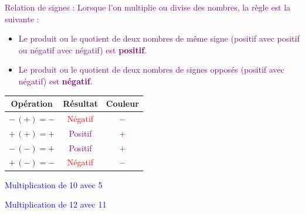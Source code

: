 \documentclass{article}
\begin{document}
\textcolor{purple}{Relation de signes : Lorsque l'on multiplie ou divise des nombres, la règle est la suivante :}
\begin{itemize}
    \item \textcolor{purple}{Le produit ou le quotient de deux nombres de même signe (positif avec positif ou négatif avec négatif) est \textbf{positif}.}
    \item \textcolor{purple}{Le produit ou le quotient de deux nombres de signes opposés (positif avec négatif) est \textbf{négatif}.}
\end{itemize}

\vspace{0.2cm}

\begin{tcolorbox}[colback=lightblue, colframe=navyblue, title=\textcolor{white}{Relations de Signes}, sharp corners=southwest]
\centering
\begin{tabular}{|c|c|c|}
\hline
\textbf{Opération} & \textbf{Résultat} & \textbf{Couleur} \\
\hline
\cellcolor{lightgray} \(- \, (+) = -\) & \textcolor{red}{Négatif} & \textcolor{red}{\(-\)} \\
\hline
\cellcolor{lightblue} \(+ \, (+) = +\) & \textcolor{purple}{Positif} & \textcolor{purple}{\(+\)} \\
\hline
\cellcolor{lightgray} \(- \, (-) = +\) & \textcolor{purple}{Positif} & \textcolor{purple}{\(+\)} \\
\hline
\cellcolor{lightblue} \(+ \, (-) = -\) & \textcolor{red}{Négatif} & \textcolor{red}{\(-\)} \\
\hline
\end{tabular}
\end{tcolorbox}

\vspace{0.3cm}

\begin{tcolorbox}[colback=cyan!10!white, colframe=orange!75!black, title=\textcolor{white}{Exemples}, sharp corners=southwest]
\centering
\begin{minipage}{0.45\textwidth}
\centering
\textcolor{blue}{Multiplication de 10 avec 5} \\
\end{minipage}%
\hfill
\begin{minipage}{0.45\textwidth}
\centering
\textcolor{blue}{Multiplication de 12 avec 11} \\
\end{minipage}
\end{tcolorbox}
\end{document}
